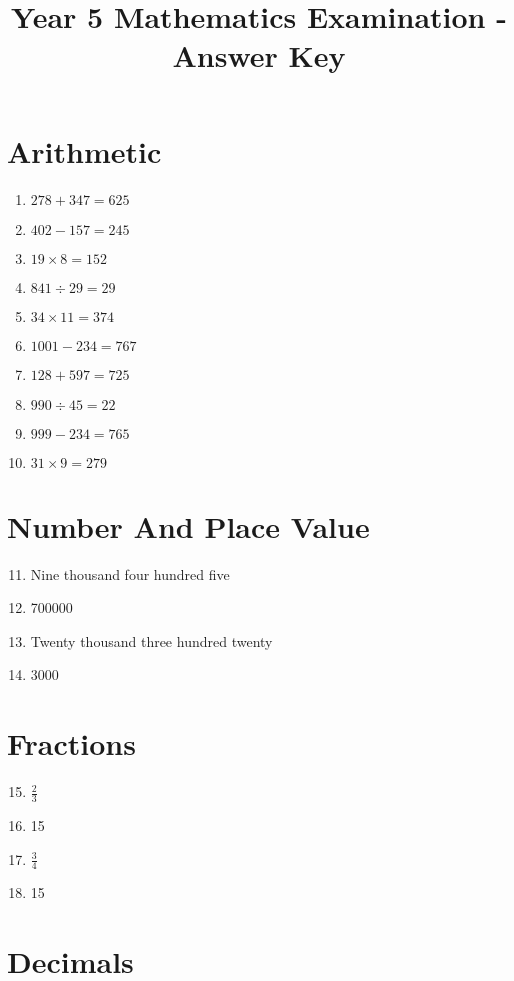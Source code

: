 \documentclass[10pt,a4paper]{article}
\begin{document}
\title{Year 5 Mathematics Examination - Answer Key}
\date{}
\maketitle

\section*{Arithmetic}

\begin{enumerate}
\item $278 + 347 = 625$
\item $402 - 157 = 245$
\item $19 \times 8 = 152$
\item $841 \div 29 = 29$
\item $34 \times 11 = 374$
\item $1001 - 234 = 767$
\item $128 + 597 = 725$
\item $990 \div 45 = 22$
\item $999 - 234 = 765$
\item $31 \times 9 = 279$
\end{enumerate}

\section*{Number And Place Value}

\begin{enumerate}
\setcounter{enumi}{10}
\item Nine thousand four hundred five
\item 700000
\item Twenty thousand three hundred twenty
\item 3000
\end{enumerate}

\section*{Fractions}

\begin{enumerate}
\setcounter{enumi}{14}
\item $\frac{2}{3}$
\item 15
\item $\frac{3}{4}$
\item 15
\end{enumerate}

\section*{Decimals}
\end{document}
